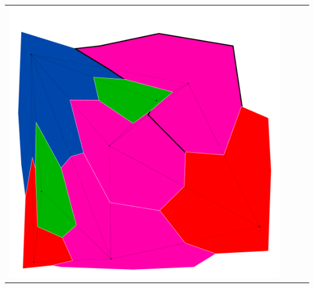 \documentclass[10pt,a4paper]{article}
\begin{document}
\begin{tabular}{c c c c }
	\includegraphics[scale=.10]{../results/min_conflicts/map_build/minconf_I00004.pdf}\\
	

\end{tabular}
\end{document}
